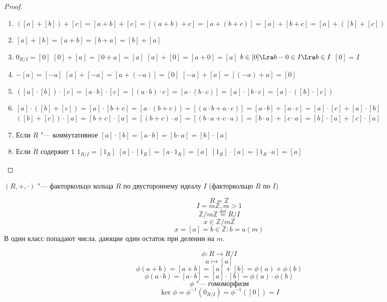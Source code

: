 \begin{proof}
	 \begin{enumerate}
	 	\item $([a] + [b]) + [c] = [a + b] + [c] = [(a + b) + c] =
	 		[a + (b + c)] = [a] + [b + c] = [a] + ([b] + [c])$
	 	\item $[a] + [b] = [a + b] = [b + a] = [b] + [a]$
		\item $0_{R/I} = [0]$
			$[0] + [a] = [0 + a] = [a]$
	 		$[a] + [0] = [a + 0] = [a]$
	 		$b \in [0] \Lra b - 0 \in I \Lra b \in I$
	 		$[0] = I$
	 	\item $-[a] = [-a]$
	 		$[a] + [-a] = [a + (-a)] = [0]$
	 		$[-a] + [a] = [(-a) + a] = [0]$
	 	\item $([a] \cdot [b]) \cdot [c] = [a \cdot b] \cdot [c] =
	 		[(a \cdot b) \cdot c] = [a \cdot (b \cdot c)] =
	 		[a] \cdot [b \cdot c] = [a] \cdot ([b] \cdot [c])$
	 	\item $[a] \cdot ([b] + [c]) = [a] \cdot [b + c] = 
	 		[a \cdot (b + c)] = [(a \cdot b + a \cdot c)] = 
	 		[a \cdot b] + [a \cdot c] = [a] \cdot [c] + [a] \cdot [b]$
	 		$([b] + [c]) \cdot [a]  = [b + c] \cdot [a] = 
	 		[(b + c)  \cdot a] = [(b \cdot a + c \cdot a)] = 
	 		[b \cdot a] + [c \cdot a] = [b] \cdot [a] + [c] \cdot [a]$
	 	\item Если $R$ "--- коммутативное
	 		$[a] \cdot [b] = [a \cdot b] = [b \cdot a] = [b] \cdot [a]$
	 	\item Если $R$ содержит $1$
	 		$1_{R/I} = [1_R]$
			$[a] \cdot [1_R] = [a \cdot 1_R] = [a]$
	 		$[1_R] \cdot [a] = [1_R \cdot a] = [a]$
	\end{enumerate}
\end{proof}
	 
\begin{Def}
	$(R, +, \cdot)$ "--- факторкольцо кольца $R$ по двустороннему
	идеалу $I$ (факторкольцо $R$ по $I$)
\end{Def}	 

\begin{exmp}
	 \[R = \mathbb{Z}\]
	 \[I = m \mathbb{Z}, m > 1\]
	 \[\mathbb{Z} /m \mathbb{Z} \overset{\text{def}}{=} R/I\]
	 \[x \in \mathbb{Z}/m\mathbb{Z}\]
	 \[x = [a] = {b \in \mathbb{Z} \colon b = a (m)}\]
	 В один класс попадают числа, 
	 дающие один остаток при делении на $m$.	 
\end{exmp}
	 
\[\phi \colon R \to R/I\]
\[a \mapsto [a]\]
\[\phi(a + b) = [a + b] = [a] + [b] = \phi(a) + \phi(b)\]
\[\phi(a \cdot b) = [a \cdot b] = [a] \cdot [b] = \phi(a) \cdot \phi(b)\]
\[\phi \text{ "--- гомоморфизм}\]
\[\ker \phi = \phi^{-1}(0_{R/I}) = \phi^{-1}([0]) = I\]
	
